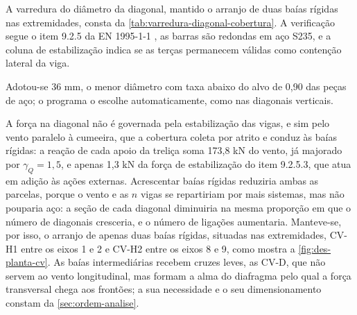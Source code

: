 A varredura do diâmetro da diagonal, mantido o arranjo de duas baías rígidas nas
extremidades, consta da \autoref{tab:varredura-diagonal-cobertura}. A
verificação segue o item 9.2.5 da EN 1995-1-1 \cite{EN1995-1-1:2004}, as barras
são redondas em aço S235, e a coluna de estabilização indica se as terças
permanecem válidas como contenção lateral da viga.


Adotou-se 36 mm, o menor diâmetro com taxa abaixo do alvo de 0,90 das peças de
aço; o programa o escolhe automaticamente, como nas diagonais verticais.

A força na diagonal não é governada pela estabilização das vigas, e sim pelo
vento paralelo à cumeeira, que a cobertura coleta por atrito e conduz às baías
rígidas: a reação de cada apoio da treliça soma 173,8 kN do vento, já majorado
por $\gamma_Q = 1{,}5$, e apenas 1,3 kN da força de estabilização do item 9.2.5.3, que atua em adição às ações
externas. Acrescentar baías rígidas
reduziria ambas as parcelas, porque o vento e as $n$ vigas se repartiriam por
mais sistemas, mas não pouparia aço: a seção de cada diagonal diminuiria na
mesma proporção em que o número de diagonais cresceria, e o número de ligações
aumentaria. Manteve-se, por isso, o arranjo de apenas duas baías rígidas, situadas
nas extremidades, CV-H1 entre os eixos 1 e 2 e CV-H2 entre os eixos 8 e 9, como
mostra a \autoref{fig:des-planta-cv}. As baías intermediárias recebem cruzes leves,
as CV-D, que não servem ao vento longitudinal, mas formam a alma do diafragma pelo
qual a força transversal chega aos frontões; a sua necessidade e o seu
dimensionamento constam da \autoref{sec:ordem-analise}.

